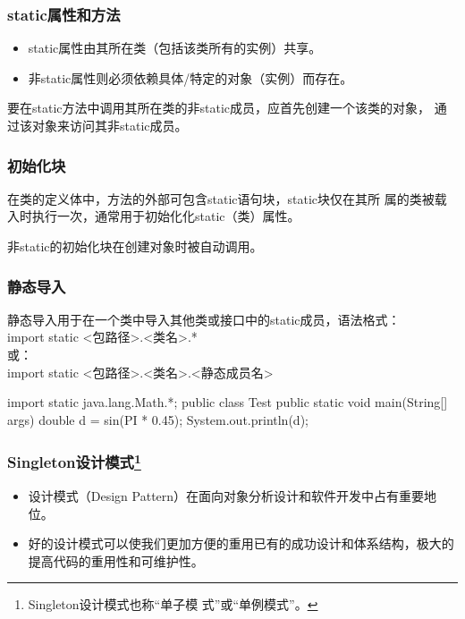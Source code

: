 \begin{frame}[fragile] %
  \frametitle{static属性和方法}
  
  \begin{itemize}
  \item static属性由其所在类（包括该类所有的实例）共享。
  \item 非static属性则必须依赖具体/特定的对象（实例）而存在。
  \end{itemize}


  要在static方法中调用其所在类的非static成员，应首先创建一个该类的对象，
  通过该对象来访问其非static成员。

\end{frame}

\begin{frame}[fragile] %
  \frametitle{初始化块}


  在类的定义体中，方法的外部可包含static语句块，{\Red static块仅在其所
    属的类被载入时执行一次}，通常用于初始化化static（类）属性。

  
  非static的初始化块在创建对象时被自动调用。

  
\end{frame}

\begin{frame}[fragile] %
\frametitle{静态导入}

静态导入用于在一个类中导入其他类或接口中的static成员，语法格式：\\
import static <包路径>.<类名>.*\\
或：\\
import static <包路径>.<类名>.<静态成员名>\\

\begin{javaCode}
import static java.lang.Math.*;
public class Test {
  public static void main(String[] args) {
    double d = sin(PI * 0.45);
    System.out.println(d);
  }
}
\end{javaCode}
\end{frame}

\begin{frame}[fragile] %
  \frametitle{Singleton设计模式\footnote{Singleton设计模式也称“单子模
      式”或“单例模式”。}}


\begin{itemize}
\item {\hei 设计模式（Design Pattern）}在面向对象分析设计和软件开发中占有重要地位。
\item 好的设计模式可以使我们更加方便的重用已有的成功设计和体系结构，极大的提高代码的重用性和可维护性。
\end{itemize}

\end{frame}

